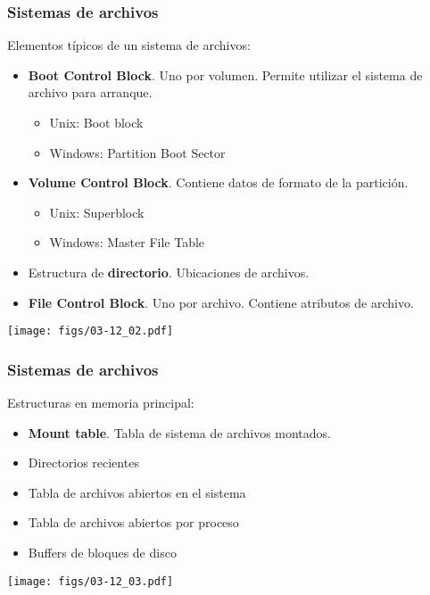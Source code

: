 \documentclass[letter]{beamer}
\begin{document}
\begin{frame}
  \frametitle{Sistemas de archivos}

  Elementos típicos de un sistema de archivos:
  \begin{itemize}
    \item {\bf Boot Control Block}. Uno por volumen. Permite utilizar el sistema de archivo para arranque.
      \begin{itemize}
        \item Unix: Boot block
        \item Windows: Partition Boot Sector
      \end{itemize}
    \item {\bf Volume Control Block}. Contiene datos de formato de la partición.
      \begin{itemize}
        \item Unix: Superblock
        \item Windows: Master File Table
      \end{itemize}
    \item Estructura de {\bf directorio}. Ubicaciones de archivos.
    \item {\bf File Control Block}. Uno por archivo. Contiene atributos de archivo.
  \end{itemize}

  \begin{center}
    \texttt{[image: figs/03-12\_02.pdf]}
  \end{center}

\end{frame}
\begin{frame}
  \frametitle{Sistemas de archivos}
  Estructuras en memoria principal:
  \begin{itemize}
    \item {\bf Mount table}. Tabla de sistema de archivos montados.
    \item Directorios recientes
    \item Tabla de archivos abiertos en el sistema
    \item Tabla de archivos abiertos por proceso
    \item Buffers de bloques de disco
  \end{itemize}
  
  \begin{center}
    \texttt{[image: figs/03-12\_03.pdf]}
  \end{center}

\end{frame}
\end{document}
